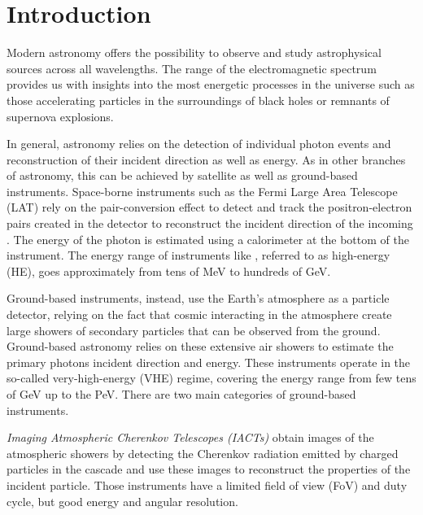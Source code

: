 \documentclass[longauth]{aa}
\begin{document}

\maketitle

\section{Introduction}
\label{sec:introduction}


Modern astronomy offers the possibility to observe and study astrophysical sources across
all wavelengths. The \gammaray range of the electromagnetic spectrum 
provides us with insights into the most energetic processes in the universe such as
those accelerating particles in the surroundings of black holes or remnants of
supernova explosions.

In general, \gammaray astronomy relies on the detection of individual 
photon events and reconstruction of their incident direction as well
as energy. As in other branches of astronomy, this can be
achieved by satellite as well as ground-based \gammaray instruments.
Space-borne instruments such as the Fermi Large Area Telescope (LAT)
rely on the pair-conversion effect to detect \gammarays and track
the positron-electron pairs created in the detector to reconstruct the incident direction 
of the incoming \gammaray. The energy of the photon is estimated using a calorimeter
at the bottom of the instrument. The energy range of instruments like \fermi \citep{Atwood2009}, referred to as
high-energy (HE), goes approximately from tens of \si{MeV} to hundreds of \si{GeV}. 

Ground-based instruments, instead, use the Earth's atmosphere as a particle detector, relying on the fact that
cosmic \gammarays interacting in the atmosphere create large showers of secondary particles that can be observed from the ground.
Ground-based \gammaray astronomy relies on these extensive air showers to estimate the
primary \gammaray photons incident direction and energy.
These instruments operate in the so-called very-high-energy (VHE) regime,
covering the energy range from few tens of \si{GeV} up to the \si{PeV}.
There are two main categories of ground-based instruments.

\textit{Imaging Atmospheric Cherenkov Telescopes (IACTs)} obtain images of the atmospheric showers
by detecting the Cherenkov radiation emitted by charged particles in the cascade and
use these images to reconstruct the properties of the incident particle.
Those instruments have a limited field of view (FoV) and duty cycle, but
good energy and angular resolution.
	
\end{document}
